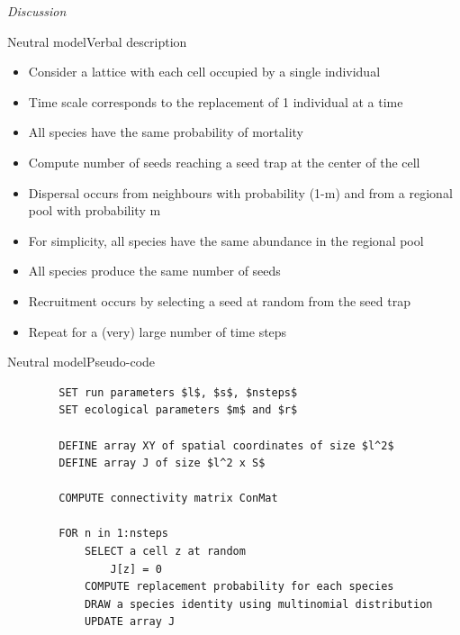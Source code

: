 \documentclass[10pt,aspectratio=149]{beamer}
\begin{document}

{
\usebackgroundtemplate{}
\begin{frame}

	\pagecolor{BDQC1st}
	\color{white}

	\LARGE{\textit{Discussion}}

\end{frame}
}


\begin{frame}{Neutral model}{Verbal description}

    \begin{itemize}
        \item Consider a lattice with each cell occupied by a single individual
        \item Time scale corresponds to the replacement of 1 individual at a time
        \item All species have the same probability of mortality
        \item Compute number of seeds reaching a seed trap at the center of the cell
        \item Dispersal occurs from neighbours with probability (1-m) and from a regional pool with probability m
        \item For simplicity, all species have the same abundance in the regional pool
        \item All species produce the same number of seeds
        \item Recruitment occurs by selecting a seed at random from the seed trap
        \item Repeat for a (very) large number of time steps
    \end{itemize}

\end{frame}


\begin{frame}[fragile]{Neutral model}{Pseudo-code}

    \begin{verbatim}
        SET run parameters $l$, $s$, $nsteps$
        SET ecological parameters $m$ and $r$
    
        DEFINE array XY of spatial coordinates of size $l^2$ 
        DEFINE array J of size $l^2 x S$
    
        COMPUTE connectivity matrix ConMat 
    
        FOR n in 1:nsteps
            SELECT a cell z at random 
                J[z] = 0
            COMPUTE replacement probability for each species
            DRAW a species identity using multinomial distribution
            UPDATE array J
    \end{verbatim}

\end{frame}
\end{document}
